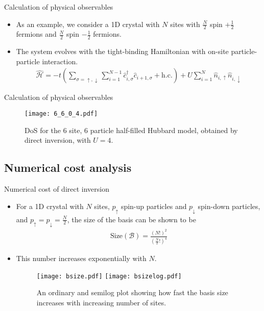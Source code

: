 \documentclass{beamer}
\newcommand{\ham}{\hat{\mathcal{H}}}
\begin{document}
	\begin{frame}{Calculation of physical observables}
		\begin{itemize}
			\item{
				As an example, we consider a 1D crystal with $ N $ sites with $ \tfrac{N}{2} $ spin $ +\tfrac{1}{2} $ fermions and $ \tfrac{N}{2} $ spin $ -\tfrac{1}{2} $ fermions.
				}
			\item {
				The system evolves with the tight-binding Hamiltonian with on-site particle-particle interaction.
			\begin{align}\label{eqn:tight-binding-hamil}
			\ham = -t \left(\sum_{\sigma = \uparrow, \downarrow} \sum_{i=1}^{N-1} \hat{c}^{\dagger}_{i, \sigma} \hat{c}^{}_{i + 1, \sigma} + \mathrm{h.c.} \right) + U \sum_{i=1}^{N}\hat{n}_{i,\uparrow} \hat{n}_{i,\downarrow}
			\end{align} }
		\end{itemize}
	\end{frame}
	
	\begin{frame}{Calculation of physical observables}
		\begin{figure}[h!]
			\centering
			\texttt{[image: 6\_6\_0\_4.pdf]}
			\caption{DoS for the 6 site, 6 particle half-filled Hubbard model, obtained by direct inversion, with $ U=4 $.}
			\label{fig:6_6_0_4}
		\end{figure}
	\end{frame}

\subsection{Numerical cost analysis}
\begin{frame}{Numerical cost of direct inversion}
	\begin{itemize}
		\item{
			For a 1D crystal with $ N $ sites, $ p_{\uparrow} $ spin-up particles and $ p_{\downarrow} $ spin-down particles, and $ p_{\uparrow} = p_{\downarrow} = \tfrac{N}{2} $, the size of the basis can be shown to be
				\begin{align}
				\mathrm{Size}\left( \mathcal{B} \right) =
				\frac{\left( N! \right)^{2} }{\left( \tfrac{N}{2}! \right)^{4}}
				\end{align}
			}
		\item {\pause
			This number increases exponentially with $ N $.
			}
		\begin{figure}[h!]
			\centering
				\texttt{[image: bsize.pdf]}\hspace{1cm}
				\texttt{[image: bsizelog.pdf]}
			\caption{An ordinary and semilog plot showing how fast the basis size increases with increasing number of sites.}
		\end{figure}
	\end{itemize}
\end{frame}
\end{document}
